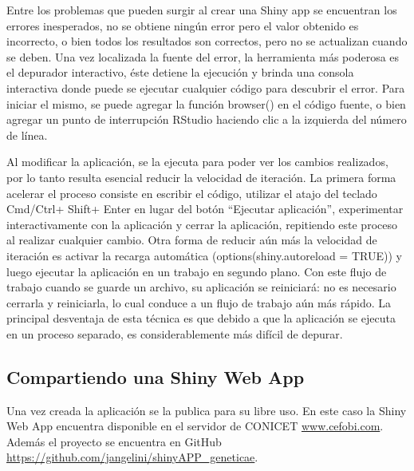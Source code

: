 Entre los problemas que pueden surgir al crear una Shiny app se encuentran los errores inesperados, no se obtiene ningún error pero el valor obtenido es incorrecto, o bien todos los resultados son correctos, pero no se actualizan cuando se deben. Una vez localizada la fuente del error, la herramienta más poderosa es el depurador interactivo, éste detiene la ejecución y brinda una consola interactiva donde puede se ejecutar cualquier código para descubrir el error. Para iniciar el mismo, se puede agregar la función browser() en el código fuente, o bien agregar un punto de interrupción RStudio haciendo clic a la izquierda del número de línea.

Al modificar la aplicación, se la ejecuta para poder ver los cambios realizados, por lo tanto resulta esencial reducir la velocidad de iteración. La primera forma acelerar el proceso consiste en escribir el código, utilizar el atajo del teclado Cmd/Ctrl+ Shift+ Enter en lugar del botón ``Ejecutar aplicación'', experimentar interactivamente con la aplicación y cerrar la aplicación, repitiendo este proceso al realizar cualquier cambio. Otra forma de reducir aún más la velocidad de iteración es activar la recarga automática (options(shiny.autoreload = TRUE)) y luego ejecutar la aplicación en un trabajo en segundo plano. Con este flujo de trabajo cuando se guarde un archivo, su aplicación se reiniciará: no es necesario cerrarla y reiniciarla, lo cual conduce a un flujo de trabajo aún más rápido. La principal desventaja de esta técnica es que debido a que la aplicación se ejecuta en un proceso separado, es considerablemente más difícil de depurar.


\subsection{Compartiendo una Shiny Web App}

Una vez creada la aplicación se la publica para su libre uso. En este caso la Shiny Web App encuentra disponible en el servidor de CONICET \url{www.cefobi.com}. Además el proyecto se encuentra en GitHub \url{https://github.com/jangelini/shinyAPP_geneticae}. 
